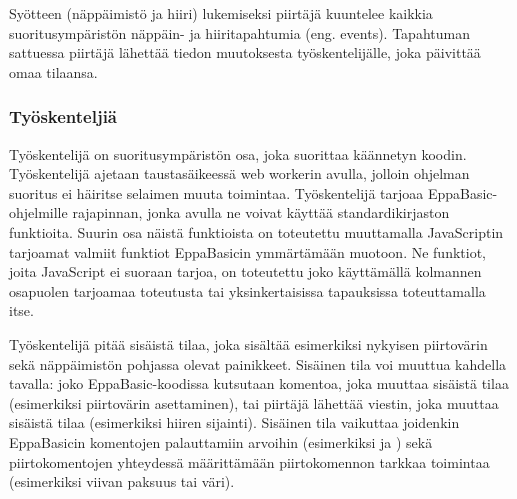 Syötteen (näppäimistö ja hiiri) lukemiseksi
piirtäjä kuuntelee kaikkia suoritusympäristön
näp\-päin- ja hiiritapahtumia (eng. events).
Tapahtuman sattuessa piirtäjä
lähettää tiedon muutoksesta työskentelijälle,
joka päivittää omaa tilaansa.

\subsubsection{Työskenteljiä}
Työskentelijä on suoritusympäristön osa,
joka suorittaa käännetyn koodin.
Työskentelijä ajetaan taustasäikeessä
web workerin avulla, jolloin ohjelman
suoritus ei häiritse selaimen muuta toimintaa.
Työskentelijä tarjoaa EppaBasic-ohjelmille
rajapinnan, jonka avulla ne voivat käyttää
standardikirjaston funktioita.
Suurin osa näistä funktioista on toteutettu
muuttamalla JavaScriptin tarjoamat valmiit
funktiot EppaBasicin ymmärtämään muotoon.
Ne funktiot, joita JavaScript ei suoraan tarjoa,
on toteutettu joko käyttämällä kolmannen osapuolen
tarjoamaa toteutusta tai yksinkertaisissa
tapauksissa toteuttamalla itse.

Työskentelijä pitää sisäistä tilaa,
joka sisältää esimerkiksi nykyisen piirtovärin
sekä näppäimistön pohjassa olevat painikkeet.
Sisäinen tila voi muuttua kahdella tavalla:
joko EppaBasic-koodissa kutsutaan komentoa,
joka muuttaa sisäistä tilaa
(esimerkiksi piirtovärin asettaminen),
tai piirtäjä lähettää viestin,
joka muuttaa sisäistä tilaa
(esimerkiksi hiiren sijainti).
Sisäinen tila vaikuttaa joidenkin
EppaBasicin komentojen palauttamiin arvoihin
(esimerkiksi  ja )
sekä piirtokomentojen yhteydessä määrittämään
piirtokomennon tarkkaa toimintaa
(esimerkiksi viivan paksuus tai väri).